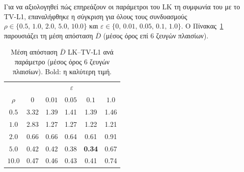 \documentclass[12pt]{article}
\begin{document}
\hspace{0.6cm}Για να αξιολογηθεί πώς επηρεάζουν οι παράμετροι του LK τη συμφωνία του με το TV-L1, επαναλήφθηκε η σύγκριση για όλους τους συνδυασμούς $\rho \in \{0.5,\,1.0,\,2.0,\,5.0,\,10.0\}$ και $\varepsilon \in \{0,\,0.01,\,0.05,\,0.1,\,1.0\}$. Ο Πίνακας~\ref{tab:lk_tvl1_params} παρουσιάζει τη μέση απόσταση $\overline{D}$ (μέσος όρος επί 6 ζευγών πλαισίων).

\begin{table}[H]
\centering
\small
\begin{tabular}{@{}c ccccc@{}}
\toprule
 & \multicolumn{5}{c}{\textbf{$\varepsilon$}} \\
\textbf{$\rho$} & $0$ & $0.01$ & $0.05$ & $0.1$ & $1.0$ \\
\midrule
$0.5$  & 3.32 & 1.39 & 1.41 & 1.39 & 1.46 \\
$1.0$  & 2.83 & 1.27 & 1.27 & 1.22 & 1.21 \\
$2.0$  & 0.66 & 0.66 & 0.64 & 0.61 & 0.91 \\
$5.0$  & 0.42 & 0.42 & 0.38 & \textbf{0.34} & 0.67 \\
$10.0$ & 0.47 & 0.46 & 0.43 & 0.41 & 0.74 \\
\bottomrule
\end{tabular}
\caption{Μέση απόσταση $\overline{D}$ LK--TV-L1 ανά παράμετρο (μέσος όρος 6 ζευγών πλαισίων). Bold: η καλύτερη τιμή.}
\label{tab:lk_tvl1_params}
\end{table}
\end{document}
